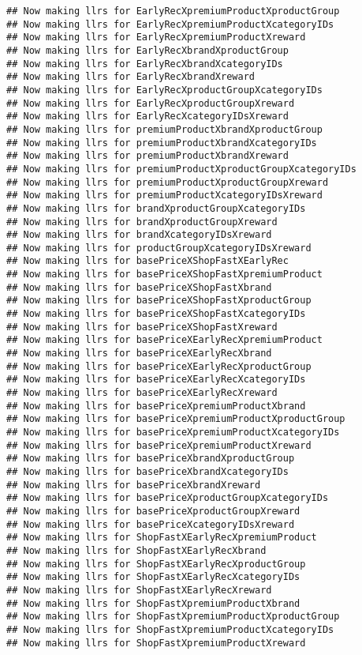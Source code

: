 \documentclass[10pt]{report}
\begin{document}
\begin{verbatim}
## Now making llrs for EarlyRecXpremiumProductXproductGroup
## Now making llrs for EarlyRecXpremiumProductXcategoryIDs
## Now making llrs for EarlyRecXpremiumProductXreward
## Now making llrs for EarlyRecXbrandXproductGroup
## Now making llrs for EarlyRecXbrandXcategoryIDs
## Now making llrs for EarlyRecXbrandXreward
## Now making llrs for EarlyRecXproductGroupXcategoryIDs
## Now making llrs for EarlyRecXproductGroupXreward
## Now making llrs for EarlyRecXcategoryIDsXreward
## Now making llrs for premiumProductXbrandXproductGroup
## Now making llrs for premiumProductXbrandXcategoryIDs
## Now making llrs for premiumProductXbrandXreward
## Now making llrs for premiumProductXproductGroupXcategoryIDs
## Now making llrs for premiumProductXproductGroupXreward
## Now making llrs for premiumProductXcategoryIDsXreward
## Now making llrs for brandXproductGroupXcategoryIDs
## Now making llrs for brandXproductGroupXreward
## Now making llrs for brandXcategoryIDsXreward
## Now making llrs for productGroupXcategoryIDsXreward
## Now making llrs for basePriceXShopFastXEarlyRec
## Now making llrs for basePriceXShopFastXpremiumProduct
## Now making llrs for basePriceXShopFastXbrand
## Now making llrs for basePriceXShopFastXproductGroup
## Now making llrs for basePriceXShopFastXcategoryIDs
## Now making llrs for basePriceXShopFastXreward
## Now making llrs for basePriceXEarlyRecXpremiumProduct
## Now making llrs for basePriceXEarlyRecXbrand
## Now making llrs for basePriceXEarlyRecXproductGroup
## Now making llrs for basePriceXEarlyRecXcategoryIDs
## Now making llrs for basePriceXEarlyRecXreward
## Now making llrs for basePriceXpremiumProductXbrand
## Now making llrs for basePriceXpremiumProductXproductGroup
## Now making llrs for basePriceXpremiumProductXcategoryIDs
## Now making llrs for basePriceXpremiumProductXreward
## Now making llrs for basePriceXbrandXproductGroup
## Now making llrs for basePriceXbrandXcategoryIDs
## Now making llrs for basePriceXbrandXreward
## Now making llrs for basePriceXproductGroupXcategoryIDs
## Now making llrs for basePriceXproductGroupXreward
## Now making llrs for basePriceXcategoryIDsXreward
## Now making llrs for ShopFastXEarlyRecXpremiumProduct
## Now making llrs for ShopFastXEarlyRecXbrand
## Now making llrs for ShopFastXEarlyRecXproductGroup
## Now making llrs for ShopFastXEarlyRecXcategoryIDs
## Now making llrs for ShopFastXEarlyRecXreward
## Now making llrs for ShopFastXpremiumProductXbrand
## Now making llrs for ShopFastXpremiumProductXproductGroup
## Now making llrs for ShopFastXpremiumProductXcategoryIDs
## Now making llrs for ShopFastXpremiumProductXreward

\end{verbatim}
\end{document}
